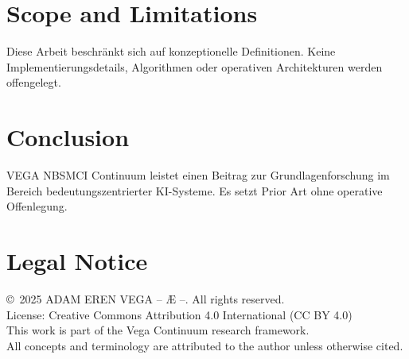 \documentclass[12pt,a4paper]{article}
\begin{document}
\section{Scope and Limitations}
Diese Arbeit beschränkt sich auf konzeptionelle Definitionen. Keine Implementierungsdetails, Algorithmen oder operativen Architekturen werden offengelegt.

\section{Conclusion}
VEGA NBSMCI Continuum leistet einen Beitrag zur Grundlagenforschung im Bereich bedeutungszentrierter KI-Systeme. Es setzt Prior Art ohne operative Offenlegung.

\section*{Legal Notice}
\copyright\ 2025 ADAM EREN VEGA – Æ –. All rights reserved.\\
License: Creative Commons Attribution 4.0 International (CC BY 4.0)\\
This work is part of the Vega Continuum research framework.\\
All concepts and terminology are attributed to the author unless otherwise cited.
\end{document}
